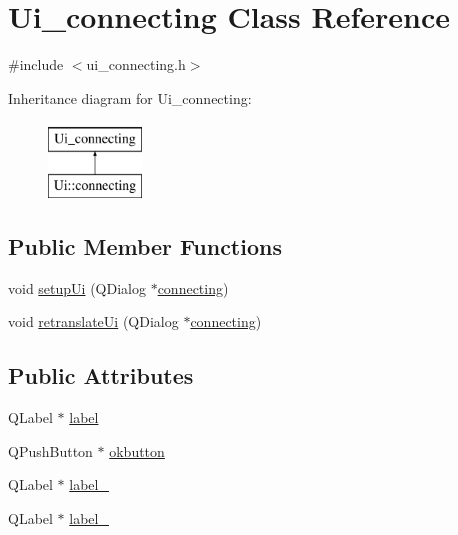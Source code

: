 \hypertarget{classUi__connecting}{\section{Ui\-\_\-connecting Class Reference}
\label{classUi__connecting}
}


{\ttfamily \#include $<$ui\-\_\-connecting.\-h$>$}

Inheritance diagram for Ui\-\_\-connecting\-:\begin{figure}[H]
\begin{center}
\leavevmode
\includegraphics[height=2.000000cm]{classUi__connecting}
\end{center}
\end{figure}
\subsection*{Public Member Functions}
\begin{DoxyCompactItemize}
\item 
void \hyperlink{classUi__connecting_ae2d739c03886bcb72423abe3aced8771}{setup\-Ui} (Q\-Dialog $\ast$\hyperlink{classconnecting}{connecting})
\item 
void \hyperlink{classUi__connecting_a409746cd9d15eafa7c1dff65ab2e6e30}{retranslate\-Ui} (Q\-Dialog $\ast$\hyperlink{classconnecting}{connecting})
\end{DoxyCompactItemize}
\subsection*{Public Attributes}
\begin{DoxyCompactItemize}
\item 
Q\-Label $\ast$ \hyperlink{classUi__connecting_a25138abdfe64a738d1a24907023b569c}{label}
\item 
Q\-Push\-Button $\ast$ \hyperlink{classUi__connecting_ab2e712d5e187d9f429caaa1353f74ffd}{okbutton}
\item 
Q\-Label $\ast$ \hyperlink{classUi__connecting_a203737b79762fe667676a0745336b09e}{label\-\_}
\item 
Q\-Label $\ast$ \hyperlink{classUi__connecting_ae3bcba707b34e2dbd957969134b5f7b7}{label\-\_}
\end{DoxyCompactItemize}



